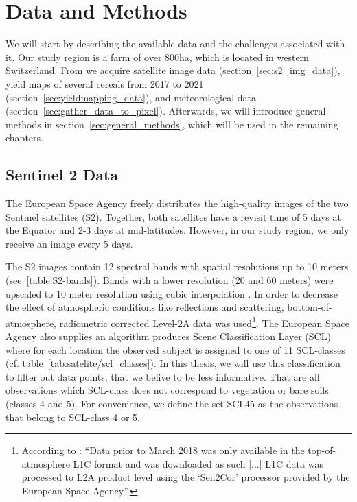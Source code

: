 \chapter{Data and Methods}\label{sec:data_methods}
{
	We will start by describing the available data and the challenges associated with it.
	Our study region is a farm of over 800ha, which is located in western Switzerland. From \cite{perichPixelbasedCropYield2022}  we acquire satellite image data (section~\ref{sec:s2_img_data}), yield maps of several cereals from 2017 to 2021 (section~\ref{sec:yieldmapping_data}), and meteorological data (section~\ref{sec:gather_data_to_pixel}).
	Afterwards, we will introduce general methods in section~\ref{sec:general_methods}, which will be used in the remaining chapters.
}


\section{Sentinel 2 Data}{
	\label{sec:s2_img_data}
	{
		The European Space Agency \citep{esaSentinel22022} freely distributes the high-quality images of the two Sentinel satellites (S2). Together, both satellites have a revisit time of 5 days at the Equator and 2-3 days at mid-latitudes. However, in our study region, we only receive an image every 5 days.
		
		
		
		The S2 images contain 12 spectral bands with spatial resolutions up to 10 meters (see~\ref{table:S2-bands}). Bands with a lower resolution (20 and 60 meters) were upscaled to 10 meter resolution using cubic interpolation \citep{perichPixelbasedCropYield2022}. In order to decrease the effect of atmospheric conditions like reflections and scattering, bottom-of-atmosphere, radiometric corrected Level-2A data was used\footnote{According to \cite{perichPixelbasedCropYield2022}: ``Data prior to March 2018 was only available in the top-of-atmosphere L1C format and was downloaded as such [...] L1C data was processed to L2A product level using the `Sen2Cor' processor provided by the European Space Agency''.}. 
		The European Space Agency also supplies an algorithm \citep{esaLevel2AAlgorithmOverview2022} produces Scene Classification Layer ({SCL}) where for each location the observed subject is assigned to one of 11 SCL-classes (cf. table~\ref{tab:satelite/scl_classes}). 
		In this thesis,  we will use this classification to filter out data points, that we belive to be less informative. That are all observations which SCL-class does not correspond to vegetation or bare soils (classes 4 and 5). For convenience, we define the set SCL45 as the observations that belong to SCL-class 4 or 5.
		
}}

